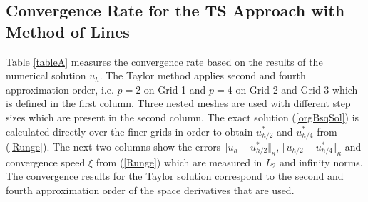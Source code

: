 \documentclass[%
 aip,
cp,  
 amsmath,amssymb,
 reprint,
]{iopconfser}
\newcommand{\rf}[1]{(\ref{#1})}
\begin{document}
\subsection{Convergence Rate for the TS Approach with Method of Lines}

Table \ref{tableA} measures the convergence rate based on the results of the numerical solution $u_h$. The Taylor method applies second and fourth approximation order, i.e. $p=2$ on Grid 1 and $p=4$ on Grid 2 and Grid 3 which is defined in the first column. 
 Three nested meshes are used with different step sizes which are present in the second column. The exact solution \rf{orgBsqSol} is calculated directly over the finer grids in order to obtain $u^*_{h/2}$ and $u^*_{h/4}$ from \rf{Runge}. The next two columns show the errors $\Vert u_{h} - u^*_{h/2} \Vert_\kappa$, $\Vert  u_{h/2} - u^*_{h/4} \Vert_\kappa$ and convergence speed $\xi$ from \rf{Runge} which are measured in $L_2$ and infinity norms. The convergence results for the Taylor solution correspond to the second and fourth approximation order of the space derivatives that are used. 
\end{document}

